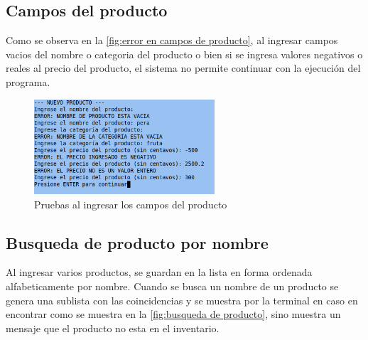 \documentclass[12pt]{article}
\begin{document}
\subsection{Campos del producto}

Como se observa en la \autoref{fig:error en campos de producto}, al ingresar campos vacios del nombre o categoria del producto o bien si se 
ingresa valores negativos o reales al precio del producto, el sistema no permite continuar con la ejecución del programa.

\begin{figure}[H]
	\centering
	\setlength{\fboxrule}{0pt}
	\includegraphics[width=0.6\textwidth]{Imagenes/img9.png}
	\caption{Pruebas al ingresar los campos del producto}
	\label{fig:error en campos de producto}
\end{figure} 

\subsection{Busqueda de producto por nombre}

Al ingresar varios productos, se guardan en la lista en forma ordenada alfabeticamente por nombre. Cuando se busca un nombre de un producto
se genera una sublista con las coincidencias y se muestra por la terminal en caso en encontrar como se muestra en la \autoref{fig:busqueda de producto}, sino muestra un mensaje que el producto no esta en el inventario.
\end{document}
